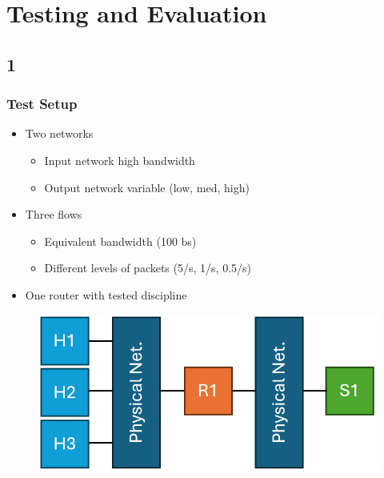 \documentclass[compress]{beamer}
\begin{document}
    \section{Testing and Evaluation}

    \subsection{1}
    \begin{frame}
        \frametitle{Test Setup}

        \begin{itemize}
            \item Two networks
            \begin{itemize}
                \item Input network high bandwidth
                \item Output network variable (low, med, high)
            \end{itemize}
            \item Three flows
            \begin{itemize}
                \item Equivalent bandwidth (100 bs)
                \item Different levels of packets (5/s, 1/s, 0.5/s)
            \end{itemize}
            \item One router with tested discipline
        \end{itemize}

        \begin{figure}[b]
            \centering
            \includegraphics[height=0.2\textheight]{../img/test-network}
        \end{figure}
    \end{frame}
\end{document}
